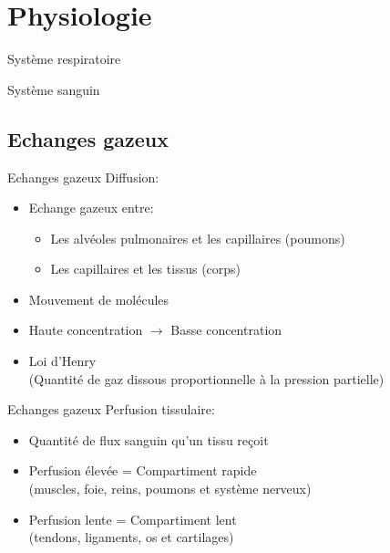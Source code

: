 
\section{Physiologie}

\begin{frame}{Système respiratoire}
\end{frame}

\begin{frame}{Système sanguin}
\end{frame}

\subsection{Echanges gazeux}

\begin{frame}{Echanges gazeux}  
	Diffusion:
	\begin{itemize}
		\item Echange gazeux entre:
		\begin{itemize}
		 	\item Les alvéoles pulmonaires et les capillaires (poumons)
		 	\item Les capillaires et les tissus (corps)
		 \end{itemize}
		\item Mouvement de molécules
		\item Haute concentration $\rightarrow$ Basse concentration
		\item Loi d'Henry\\ (Quantité de gaz dissous proportionnelle à la pression partielle)
	\end{itemize}
\end{frame}

\begin{frame}{Echanges gazeux}  
	Perfusion tissulaire:
	\begin{itemize}
		\item Quantité de flux sanguin qu'un tissu reçoit
		\item Perfusion élevée = Compartiment rapide\\(muscles, foie, reins, poumons et système nerveux)
		\item Perfusion lente = Compartiment lent\\(tendons, ligaments, os et cartilages)
	\end{itemize}
\end{frame}

